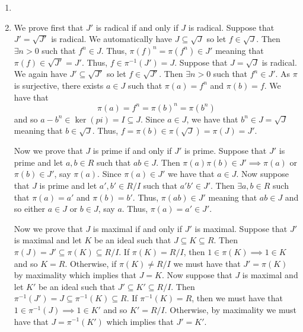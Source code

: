 \documentclass[letterpaper, 11pt, oneside]{book}
\begin{document}
\begin{sol}\label{ex:Curves_1.22}
  \begin{enumerate}[label= (\alph*)]
    \item {}
    \item We prove first that $J'$ is radical if and only if $J$ is radical.
          Suppose that $J' = \sqrt{J'}$ is radical.
          We automatically have $J \subseteq \sqrt{J}$ so let $f \in \sqrt{J}$.
          Then $\exists n > 0$ such that $f^{n} \in J$.
          Thus, $\pi(f)^{n} = \pi(f^{n}) \in J'$ meaning that $\pi(f) \in \sqrt{J'} = J'$.
          Thus, $f \in \pi^{-1}(J') = J$.
          Suppose that $J = \sqrt{J}$ is radical.
          We again have $J' \subseteq \sqrt{J'}$ so let $f \in \sqrt{J'}$.
          Then $\exists n > 0$ such that $f^{n} \in J'$.
          As $\pi$ is surjective, there exists $a \in J$ such that $\pi(a) = f^{n}$ and $\pi(b) = f$.
          We have that
          \[
            \pi(a) = f^{n} = \pi(b)^{n} = \pi(b^{n})
          \]
          and so $a - b^{n} \in \ker(pi) = I \subseteq J$.
          Since $a \in J$, we have that $b^{n} \in J = \sqrt{J}$ meaning that $b \in \sqrt{J}$.
          Thus, $f = \pi(b) \in \pi(\sqrt{J}) = \pi(J) = J'$.

          Now we prove that $J$ is prime if and only if $J'$ is prime.
          Suppose that $J'$ is prime and let $a, b \in R$ such that $ab \in J$.
          Then $\pi(a)\pi(b) \in J' \implies \pi(a)$ or $\pi(b) \in J'$, say $\pi(a)$.
          Since $\pi(a) \in J'$ we have that $a \in J$.
          Now suppose that $J$ is prime and let $a', b' \in R/I$ such that $a'b' \in J'$.
          Then $\exists a, b \in R$ such that $\pi(a) = a'$ and $\pi(b) = b'$.
          Thus, $\pi(ab) \in J'$ meaning that $ab \in J$ and so either $a \in J$ or $b \in J$, say $a$.
          Thus, $\pi(a) = a' \in J'$.

          Now we prove that $J$ is maximal if and only if $J'$ is maximal.
          Suppose that $J'$ is maximal and let $K$ be an ideal such that $J \subseteq K \subseteq R$.
          Then $\pi(J) = J' \subseteq \pi(K) \subseteq R/I$.
          If $\pi(K) = R / I$, then $1 \in \pi(K) \implies 1 \in K$ and so $K = R$.
          Otherwise, if $\pi(K) \neq R / I$ we must have that $J' = \pi(K)$ by maximality which implies that $J = K$.
          Now suppose that $J$ is maximal and let $K'$ be an ideal such that $J' \subseteq K' \subseteq R/I$.
          Then $\pi^{-1}(J') = J \subseteq \pi^{-1}(K) \subseteq R$.
          If $\pi^{-1}(K) = R$, then we must have that $1 \in \pi^{-1}(J) \implies 1 \in K'$ and so $K' = R/I$.
          Otherwise, by maximality we must have that $J = \pi^{-1}(K')$ which implies that $J' = K'$.
  \end{enumerate}
\end{sol}

\printbibliography
\end{document}
